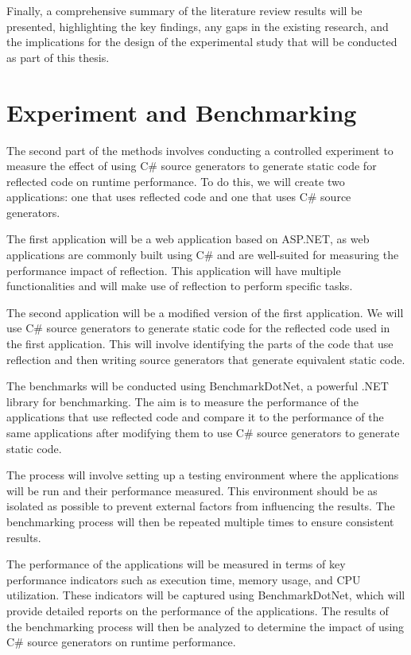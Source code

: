 Finally, a comprehensive summary of the literature review results will be presented, highlighting the key findings, any gaps in the existing research, and the implications for the design of the experimental study that will be conducted as part of this thesis.


\section{Experiment and Benchmarking}

The second part of the methods involves conducting a controlled experiment to measure the effect of using C\# source generators to generate static code for reflected code on runtime performance. To do this, we will create two applications: one that uses reflected code and one that uses C\# source generators.

The first application will be a web application based on ASP.NET, as web applications are commonly built using C\# and are well-suited for measuring the performance impact of reflection. This application will have multiple functionalities and will make use of reflection to perform specific tasks.

The second application will be a modified version of the first application. We will use C\# source generators to generate static code for the reflected code used in the first application. This will involve identifying the parts of the code that use reflection and then writing source generators that generate equivalent static code.

The benchmarks will be conducted using BenchmarkDotNet, a powerful .NET library for benchmarking. The aim is to measure the performance of the applications that use reflected code and compare it to the performance of the same applications after modifying them to use C\# source generators to generate static code.

The process will involve setting up a testing environment where the applications will be run and their performance measured. This environment should be as isolated as possible to prevent external factors from influencing the results. The benchmarking process will then be repeated multiple times to ensure consistent results.

The performance of the applications will be measured in terms of key performance indicators such as execution time, memory usage, and CPU utilization. These indicators will be captured using BenchmarkDotNet, which will provide detailed reports on the performance of the applications. The results of the benchmarking process will then be analyzed to determine the impact of using C\# source generators on runtime performance.

